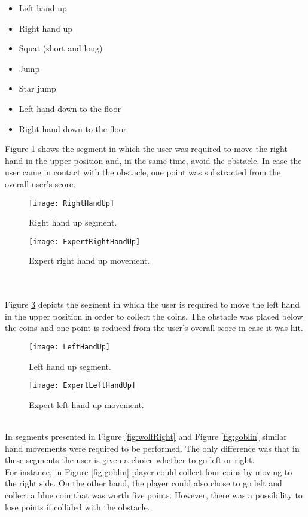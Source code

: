 \begin{itemize}
\item Left hand up
\item Right hand up
\item Squat (short and long)
\item Jump
\item Star jump
\item Left hand down to the floor
\item Right hand down to the floor
\end{itemize}
Figure \ref{fig:rightup} shows the segment in which the user was required to move the right hand in the upper position and, in the same time, avoid the obstacle. In case the user came in contact with the obstacle, one point was substracted from the overall user's score.\\
\begin{figure}[h]
    \centering
    \texttt{[image: RightHandUp]}
    \caption{Right hand up segment.}
    \label{fig:rightup}
\end{figure}
\begin{figure}[h]
    \centering
    \texttt{[image: ExpertRightHandUp]}
    \caption{Expert right hand up movement.}
    \label{fig:expertRightHandUp}
\end{figure}\\\\
Figure \ref{fig:leftup} depicts the segment in which the user is required to move the left hand in the upper position in order to collect the coins. The obstacle was placed below the coins and one point is reduced from the user's overall score in case it was hit.\\
\begin{figure}[h]
    \centering
    \texttt{[image: LeftHandUp]}
    \caption{Left hand up segment.}
    \label{fig:leftup}
\end{figure}
\begin{figure}[h]
    \centering
    \texttt{[image: ExpertLeftHandUp]}
    \caption{Expert left hand up movement.}
    \label{fig:leftHandUp}
\end{figure}\\
In segments presented in Figure \ref{fig:wolfRight} and Figure \ref{fig:goblin} similar hand movements were required to be performed. The only difference was that in these segments the user is given a choice whether to go left or right. \\For instance, in Figure \ref{fig:goblin} player could collect four coins by moving to the right side. On the other hand, the player could also chose to go left and collect a blue coin that was worth five points. However, there was a possibility to lose points if collided with the obstacle.\\
